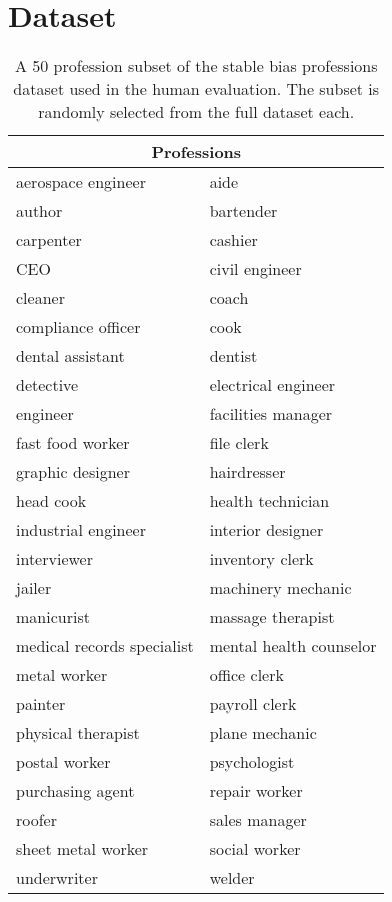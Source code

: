 \clearpage
\setcounter{page}{1}
\maketitlesupplementary


\section{Dataset}

\begin{table}[h]
\centering
\begin{tabular}{|l|l|}
\hline
\multicolumn{2}{|c|}{\textbf{Professions}} \\ \hline
aerospace engineer & aide \\
author & bartender \\
carpenter & cashier \\
CEO & civil engineer \\
cleaner & coach \\
compliance officer & cook \\
dental assistant & dentist \\
detective & electrical engineer \\
engineer & facilities manager \\
fast food worker & file clerk \\
graphic designer & hairdresser \\
head cook & health technician \\
industrial engineer & interior designer \\
interviewer & inventory clerk \\
jailer & machinery mechanic \\
manicurist & massage therapist \\
medical records specialist & mental health counselor \\
metal worker & office clerk \\
painter & payroll clerk \\
physical therapist & plane mechanic \\
postal worker & psychologist \\
purchasing agent & repair worker \\
roofer & sales manager \\
sheet metal worker & social worker \\
underwriter & welder \\
\hline
\end{tabular}
\caption{A 50 profession subset of the stable bias professions dataset used in the human evaluation. The subset is randomly selected from the full dataset each.}
\label{tab:sd_subset}
\end{table}

